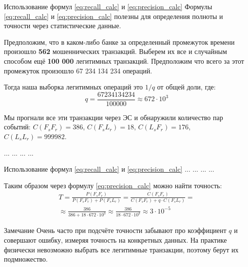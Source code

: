   \begin{frame}{Использование формул \eqref{eq:recall_calc} и \eqref{eq:precision_calc}}\label{frame:precision_calc_example}
  \small
  Формулы \eqref{eq:recall_calc} и \eqref{eq:precision_calc} полезны 
  для определения полноты и точности через статистические данные.
  
  Предположим, что в каком-либо банке за определенный промежуток времени
  произошло \textbf{562} мошеннических транзакций. 
  Выберем их все и случайным способом ещё \textbf{100 000} легитимных транзакций.
  Предположим что всего за этот промежуток произошло 67 234 134 234 операций. 
  
  Тогда наша выборка легитимных операций это $1/q$ от общей доли, где: 
  \begin{equation*}
  q = \frac{67234134234}{100000} \approx 672 \cdot 10^3
  \end{equation*}
  
  Мы прогнали все эти транзакции через ЭС и обнаружили количество пар событий:
  $C(F_s F_r)= 386$, 
  $C(F_s L_r)= 18$, 
  $C(L_s F_r)= 176$, 
  $C(L_s L_r)= 999 982$.
   
  ... ... ... ...
  \end{frame}
   
  \begin{frame}{Использование формул \eqref{eq:recall_calc} и \eqref{eq:precision_calc}} 
  ... ... ... ...
  
  Таким образом через формулу  \eqref{eq:precision_calc} можно найти точность:
  \begin{eqnarray*}
  T = \frac{P(F_s F_r)}{P(F_s F_r) + P(F_s L_r )} = 
  \frac{C(F_s F_r)}{C(F_s F_r) + q \cdot C(F_s L_r)}  = \\
  \approx \frac{386}{386 + 18 \cdot  672 \cdot 10^3 }
  \approx \frac{386}{18 \cdot  672 \cdot 10^3 }
  \approx 3 \cdot 10^{-5}
  \end{eqnarray*}
  
  \begin{block}{Замечание}
  	Очень часто при подсчёте точности забывают про коэффициент $q$ 
  	и совершают ошибку, измеряя точность на конкретных данных.
  	На практике физически невозможно выбрать все легитимные транзакции,
  	поэтому берут их подмножество.
  \end{block}

  \end{frame}
  
